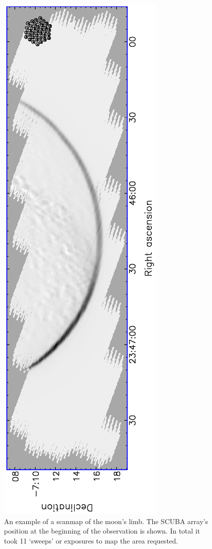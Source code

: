 \documentclass[twoside,11pt]{article}
\renewcommand{\_}{\texttt{\symbol{95}}}
\begin{document}
\begin{figure}
\begin{center}
\includegraphics[angle=-90,width=\textwidth]{sc11_fig8.eps}
\caption{An example of a scanmap of the moon's limb. The SCUBA
array's position at the beginning of the observation is shown.  In
total it took 11 `sweeps' or exposures to map the area requested.}

\label{fig:moon}
\end{center}
\end{figure}
\end{document}
